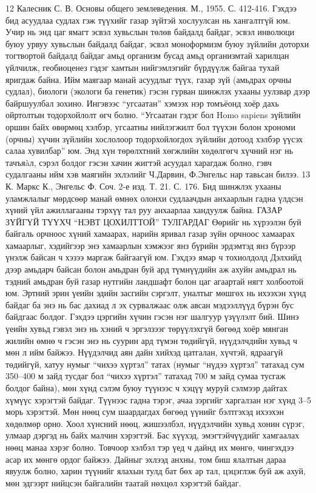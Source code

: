 12 Калесник С. В. Основы общего землеведения. М., 1955. С. 412-416.
Гэхдээ бид асуудлаа судлах гэж түүхийг газар зүйтэй хослуулсан нь хангалтгүй юм. Учир нь энд цаг ямагт эсвэл хувьслын төлөв байдалд байдаг, эсвэл инволюци буюу урвуу хувьслын байдалд байдаг, эсвэл моноформизм буюу зүйлийн доторхи тогтвортой байдалд байдаг амьд организм бусад амьд организмтай харилцан үйлчилж, геобиоценез гэдэг хамтын нийгэмлэгийг бүрдүүлж байгаа тухай яригдаж байна.
Ийм маягаар манай асуудлыг түүх, газар зүй (амьдрах орчны судлал), биологи (экологи ба генетик) гэсэн гурван шинжлэх ухааны уулзвар дээр байршуулбал зохино. Ингэвээс “угсаатан” хэмээх нэр томъёонд хоёр дахь ойртолтын тодорхойлолт өгч болно. “Угсаатан гэдэг бол Homo sapiens зүйлийн оршин байх өвөрмөц хэлбэр, угсаатны нийлэгжилт бол түүхэн болон хрономи (орчны) хүчин зүйлийн хослолоор тодорхойлогдох зүйлийн дотоод хэлбэр үүсэх салаа хувилбар” юм.
Энд хүн төрөлхтний хөгжлийн хөдөлгөгч хүчний нэг нь тачъяàл, сэрэл болдог гэсэн хачин жигтэй асуудал харагдаж болно, гэвч судалгааны ийм хэв маягийн эхлэлийг Ч.Дарвин, Ф.Энгельс нар тавьсан билээ.
13 К. Маркс К., Энгельс Ф. Соч. 2-е изд. Т. 21. С. 176.
Бид шинжлэх ухааны уламжлалыг мөрдсөөр манай өмнөх олонхи судлаачдын анхаарлын гадна үлдсэн хүний үйл ажиллагааны тэрхүү тал руу анхаарлаа хандуулж байна.
ГАЗАР ЗҮЙГҮЙ ТҮҮХЧ “НЭВТ ЦОХИЛТТОЙ” ТУЛГАРДАГ
Өөрийг нь хүрээлэн буй байгаль орчноос хүний хамаарах, нарийн яривал газар зүйн орчноос хамаарах хамаарлыг, хэдийгээр энэ хамаарлын хэмжээг янз бүрийн эрдэмтэд янз бүрээр үнэлж байсан ч хэзээ маргаж байгаагүй юм. Гэхдээ ямар ч тохиолдолд Дэлхийд дээр амьдарч байсан болон амьдран буй ард түмнүүдийн аж ахуйн амьдрал нь тэдний амьдран буй газар нутгийн ландшафт болон цаг агаартай нягт холбоотой юм. Эртний эрин үеийн эдийн засгийн сэргэлт, уналтыг мөшгөх нь ихээхэн хүнд байдаг ба энэ нь бас дахиад л эх сурвалжаас олж авсан мэдээллүүд бүрэн бус байдгаас болдог. Гэхдээ цэргийн хүчин гэсэн нэг шалгуур үзүүлэлт бий. Шинэ үеийн хувьд гэвэл энэ нь хэний ч эргэлзээг төрүүлэхгүй бөгөөд хоёр мянган жилийн өмнө ч гэсэн энэ нь суурин ард түмэн төдийгүй, нүүдэлчдийн хувьд ч мөн л ийм байжээ.
Нүүдэлчид аян дайн хийхэд цатгалан, хүчтэй, ядраагүй төдийгүй, хатуу нумыг “чихээ хүртэл” татах (нумыг “нүдээ хүртэл” татахад сум 350–400 м зайд тусдаг бол “чихээ хүртэл” татахад 700 м зайд сумаа тусгаж болдог байна), мөн хүнд сэлэм буюу түүнээс ч хэцүү муруй сэлмээр дайтах хүмүүс хэрэгтэй байдаг. Түүнээс гадна тэрэг, ачаа зэргийг харгалзан нэг хүнд 3–5 морь хэрэгтэй. Мөн нөөц сум шаардагдах бөгөөд үүнийг бэлтгэхэд ихээхэн хөдөлмөр орно. Хоол хүнсний нөөц, жишээлбэл, нүүдэлчийн хувьд хонин сүрэг, улмаар дэргэд нь байх малчин хэрэгтэй. Бас хүүхэд, эмэгтэйчүүдийг хамгаалах нөөц манаа хэрэг болно. Товчоор хэлбэл тэр үед ч дайнд их мөнгө, чингэхдээ асар их мөнгө ордог байжээ. Дайныг эхлээд анхны, том биш ялалтын дараа явуулж болно, харин түүнийг ялахын тулд бат бөх ар тал, цэцэглэж буй аж ахуй, мөн эдгээрт нийцсэн байгалийн таатай нөхцөл хэрэгтэй байдаг.
